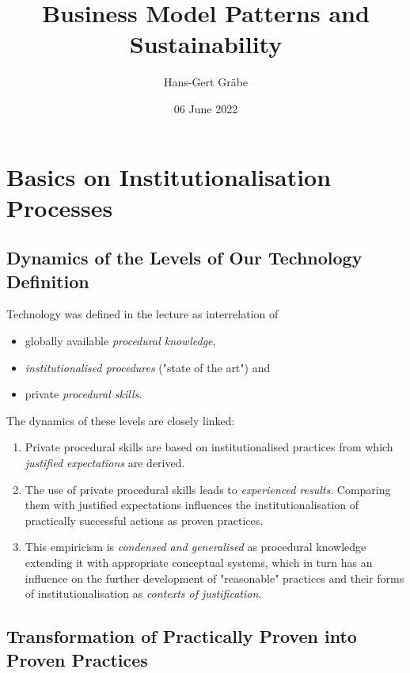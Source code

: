 \documentclass[11pt,a4paper]{article}
\title{Business Model Patterns and Sustainability}
\author{Hans-Gert Gr\"abe}
\date{06 June 2022}
\begin{document}
\maketitle
\tableofcontents
\newpage

\section{Basics on Institutionalisation Processes}

\subsection{Dynamics of the Levels of Our Technology Definition}

Technology was defined in the lecture as interrelation of
\begin{itemize}
\item globally available \emph{procedural knowledge}, 
\item \emph{institutionalised procedures} ("state of the art") and
\item private \emph{procedural skills}.
\end{itemize}

The dynamics of these levels are closely linked:
\begin{enumerate}
\item Private procedural skills are based on institutionalised practices from
  which \emph{justified expectations} are derived.
\item The use of private procedural skills leads to \emph{experienced
  results}. Comparing them with justified expectations influences the
  institutionalisation of practically successful actions as proven practices.
\item This empiricism is \emph{condensed and generalised} as procedural
  knowledge extending it with appropriate conceptual systems, which in turn
  has an influence on the further development of "reasonable" practices and
  their forms of institutionalisation as \emph{contexts of justification}.
\end{enumerate}

\subsection{Transformation of Practically Proven into Proven Practices}
\end{document}
